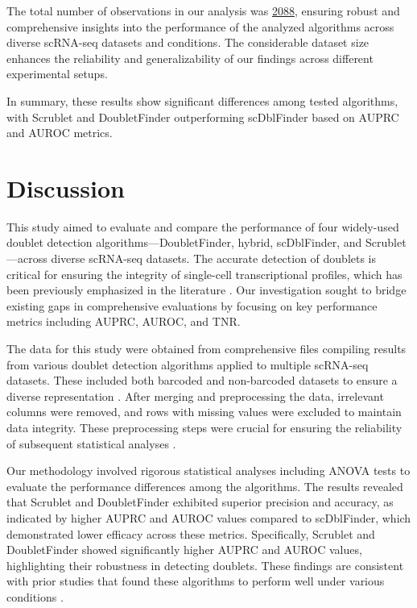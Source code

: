 \documentclass[11pt]{article}
\begin{document}
The total number of observations in our analysis was \hyperlink{R0a}{2088}, ensuring robust and comprehensive insights into the performance of the analyzed algorithms across diverse scRNA-seq datasets and conditions. The considerable dataset size enhances the reliability and generalizability of our findings across different experimental setups.

In summary, these results show significant differences among tested algorithms, with Scrublet and DoubletFinder outperforming scDblFinder based on AUPRC and AUROC metrics.

\section*{Discussion}

This study aimed to evaluate and compare the performance of four widely-used doublet detection algorithms—DoubletFinder, hybrid, scDblFinder, and Scrublet—across diverse scRNA-seq datasets. The accurate detection of doublets is critical for ensuring the integrity of single-cell transcriptional profiles, which has been previously emphasized in the literature \cite{Xi2020BenchmarkingCD, McGinnis2018DoubletFinderDD, Bais2019scdsCA}. Our investigation sought to bridge existing gaps in comprehensive evaluations by focusing on key performance metrics including AUPRC, AUROC, and TNR.

The data for this study were obtained from comprehensive files compiling results from various doublet detection algorithms applied to multiple scRNA-seq datasets. These included both barcoded and non-barcoded datasets to ensure a diverse representation \cite{Pont2019SingleCellSE, Freytag2018ComparisonOC}. After merging and preprocessing the data, irrelevant columns were removed, and rows with missing values were excluded to maintain data integrity. These preprocessing steps were crucial for ensuring the reliability of subsequent statistical analyses \cite{Deb2014AnEM}.

Our methodology involved rigorous statistical analyses including ANOVA tests to evaluate the performance differences among the algorithms. The results revealed that Scrublet and DoubletFinder exhibited superior precision and accuracy, as indicated by higher AUPRC and AUROC values compared to scDblFinder, which demonstrated lower efficacy across these metrics. Specifically, Scrublet and DoubletFinder showed significantly higher AUPRC and AUROC values, highlighting their robustness in detecting doublets. These findings are consistent with prior studies that found these algorithms to perform well under various conditions \cite{Xi2020BenchmarkingCD, McGinnis2018DoubletFinderDD, Germain2021DoubletII}.
\end{document}
